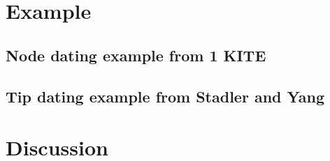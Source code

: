 \documentclass{llncs}
\begin{document}
\section{Example}
\subsection{Node dating example from 1 KITE}

\subsection{Tip dating example from Stadler and Yang}

\section{Discussion}




\end{document}
